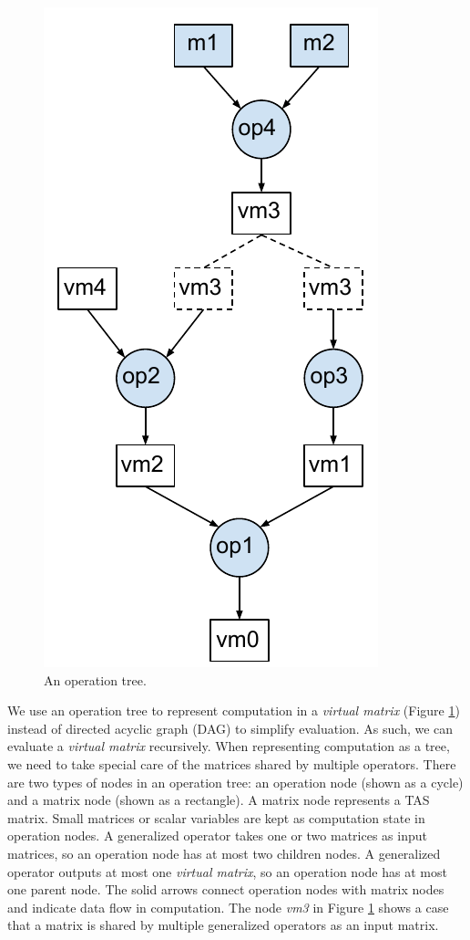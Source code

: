 \begin{figure}
	\centering
	\includegraphics[scale=0.5]{./op_tree.pdf}
	\caption{An operation tree.}
	\label{fig:op_tree}
\end{figure}

We use an operation tree to represent computation in a \textit{virtual matrix}
(Figure \ref{fig:op_tree}) instead of directed acyclic graph (DAG) \cite{}
to simplify evaluation. As such, we can evaluate a \textit{virtual matrix}
recursively. When representing computation as a tree, we need to take special
care of the matrices shared by multiple operators. There are two types of nodes
in an operation tree: an operation node (shown as a cycle) and a matrix node
(shown as a rectangle). A matrix node represents a TAS matrix. Small matrices
or scalar variables are kept as computation state in operation nodes. A generalized
operator
takes one or two matrices as input matrices, so an operation node has at most two
children nodes. A generalized operator outputs at most one \textit{virtual matrix},
so an operation node has at most one parent node. The solid arrows connect
operation nodes with matrix nodes and indicate data flow in computation.
The node \textit{vm3} in Figure \ref{fig:op_tree} shows a case that a matrix
is shared by multiple generalized operators as an input matrix.

